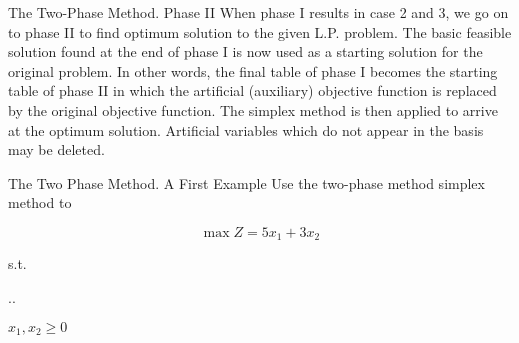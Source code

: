\begin{frame}{The Two-Phase Method. Phase II}
  When phase I results in case 2 and 3, we go on to phase II to find optimum solution to the given L.P. problem. The basic feasible solution found at the end of phase I is now used as a starting solution for the original problem. In other words, \alert{the final table of phase I becomes the starting table of phase II in which the artificial (auxiliary) objective function is replaced by the original objective function. The simplex method is then applied to arrive at the optimum solution}. Artificial variables which do not appear in the basis may be deleted.
\end{frame}


\begin{frame}{The Two Phase Method. A First Example}
  Use the two-phase method simplex method to

  \[\max Z = 5x_1 + 3x_2\]

  {\centering
    s.t.

  \sysdelim..%

  $x_1, x_2 \geq 0$
\par}
\end{frame}

